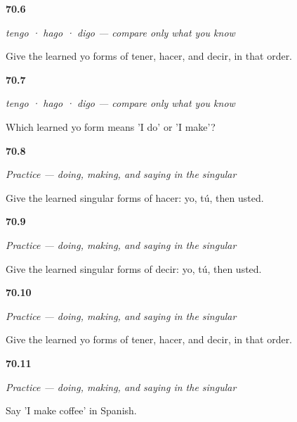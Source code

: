 \noindent\begin{minipage}[t]{\linewidth}
\raggedright
\hypertarget{review-ES-C12-yo-go-learned-order}{\textbf{70.6}} \emph{tengo · hago · digo — compare only what you know}\par
\small Give the learned yo forms of tener, hacer, and decir, in that order.
\end{minipage}\par\medskip

\noindent\begin{minipage}[t]{\linewidth}
\raggedright
\hypertarget{review-ES-C12-yo-go-hacer-choice}{\textbf{70.7}} \emph{tengo · hago · digo — compare only what you know}\par
\small Which learned yo form means 'I do' or 'I make'?
\end{minipage}\par\medskip

\noindent\begin{minipage}[t]{\linewidth}
\raggedright
\hypertarget{review-ES-C12-practice-hacer-forms}{\textbf{70.8}} \emph{Practice — doing, making, and saying in the singular}\par
\small Give the learned singular forms of hacer: yo, tú, then usted.
\end{minipage}\par\medskip

\noindent\begin{minipage}[t]{\linewidth}
\raggedright
\hypertarget{review-ES-C12-practice-decir-forms}{\textbf{70.9}} \emph{Practice — doing, making, and saying in the singular}\par
\small Give the learned singular forms of decir: yo, tú, then usted.
\end{minipage}\par\medskip

\noindent\begin{minipage}[t]{\linewidth}
\raggedright
\hypertarget{review-ES-C12-practice-yo-go-order}{\textbf{70.10}} \emph{Practice — doing, making, and saying in the singular}\par
\small Give the learned yo forms of tener, hacer, and decir, in that order.
\end{minipage}\par\medskip

\noindent\begin{minipage}[t]{\linewidth}
\raggedright
\hypertarget{review-ES-C12-practice-make-coffee}{\textbf{70.11}} \emph{Practice — doing, making, and saying in the singular}\par
\small Say 'I make coffee' in Spanish.
\end{minipage}\par\medskip

